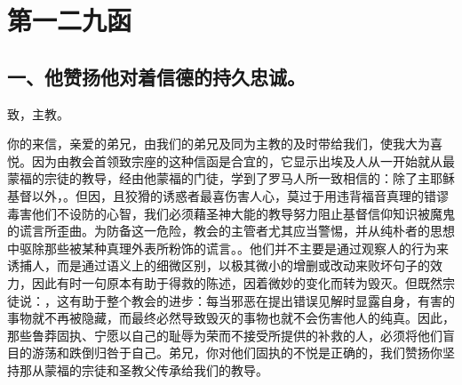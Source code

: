 

\section{第一二九函}

\par


\subsection{一、他赞扬他对着信德的持久忠诚。}

致，主教。\par

你的来信，亲爱的弟兄，由我们的弟兄及同为主教的及时带给我们，使我大为喜悦。因为由教会首领致宗座的这种信函是合宜的，它显示出埃及人从一开始就从最蒙福的宗徒的教导，经由他蒙福的门徒，学到了罗马人所一致相信的：除了主耶稣基督以外，。但因，且狡猾的诱惑者最喜伤害人心，莫过于用违背福音真理的错谬毒害他们不设防的心智，我们必须藉圣神大能的教导努力阻止基督信仰知识被魔鬼的谎言所歪曲。为防备这一危险，教会的主管者尤其应当警惕，并从纯朴者的思想中驱除那些被某种真理外表所粉饰的谎言。。他们并不主要是通过观察人的行为来诱捕人，而是通过语义上的细微区别，以极其微小的增删或改动来败坏句子的效力，因此有时一句原本有助于得救的陈述，因着微妙的变化而转为毁灭。但既然宗徒说：，这有助于整个教会的进步：每当邪恶在提出错误见解时显露自身，有害的事物就不再被隐藏，而最终必然导致毁灭的事物也就不会伤害他人的纯真。因此，那些鲁莽固执、宁愿以自己的耻辱为荣而不接受所提供的补救的人，必须将他们盲目的游荡和跌倒归咎于自己。弟兄，你对他们固执的不悦是正确的，我们赞扬你坚持那从蒙福的宗徒和圣教父传承给我们的教导。\par

